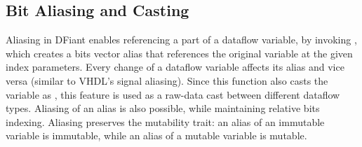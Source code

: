 



\subsection{Bit Aliasing and Casting}
Aliasing in DFiant enables referencing a part of a dataflow variable, by invoking , which creates a bits vector alias that references the original variable at the given index parameters. Every change of a dataflow variable affects its alias and vice versa (similar to VHDL's signal aliasing). Since this function also casts the variable as , this feature is used as a raw-data cast between different dataflow types. Aliasing of an alias is also possible, while maintaining relative bits indexing. Aliasing preserves the mutability trait: an alias of an immutable variable is immutable, while an alias of a mutable variable is mutable. 


%  

